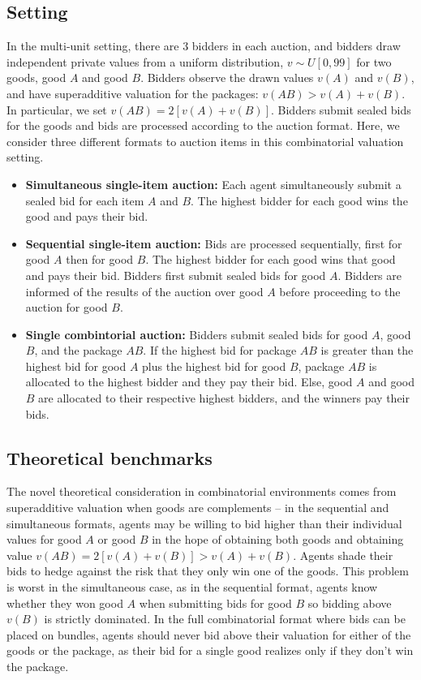 \documentclass{article} %
\begin{document}
\subsection{Setting} In the multi-unit setting, there are 3 bidders in each auction, and bidders draw independent private values from a uniform distribution, $v \sim U[0, 99]$ for two goods, good $A$ and good $B$. 
Bidders observe the drawn values $v(A)$ and $v(B)$, and have superadditive valuation for the packages: $v(AB) > v(A) + v(B)$. 
In particular, we set $v(AB) = 2[v(A) + v(B)]$.
Bidders submit sealed bids for the goods and bids are processed according to the auction format. 
Here, we consider three different formats to auction items in this combinatorial valuation setting.
\begin{itemize}
    \item \textbf{Simultaneous single-item auction:} Each agent simultaneously submit a sealed bid for each item $A$ and $B$. The highest bidder for each good wins the good and pays their bid. \vspace{1mm}
    
    \item \textbf{Sequential single-item auction:} Bids are processed sequentially, first for good $A$ then for good $B$. The highest bidder for each good wins that good and pays their bid. Bidders first submit sealed bids for good $A$. Bidders are informed of the results of the auction over good $A$ before proceeding to the auction for good $B$. \vspace{1mm}
    
    \item \textbf{Single combintorial auction:} Bidders submit sealed bids for good $A$, good $B$, and the package $AB$. If the highest bid for package $AB$ is greater than the highest bid for good $A$ plus the highest bid for good $B$, package $AB$ is allocated to the highest bidder and they pay their bid. Else, good $A$ and good $B$ are allocated to their respective highest bidders, and the winners pay their bids. 
\end{itemize}

\subsection{Theoretical benchmarks}
The novel theoretical consideration in combinatorial environments comes from superadditive valuation when goods are complements -- in the sequential and simultaneous formats, agents may be willing to bid higher than their individual values for good $A$ or good $B$ in the hope of obtaining both goods and obtaining value $v(AB) = 2[v(A) + v(B)] > v(A)+v(B)$. 
Agents shade their bids to hedge against the risk that they only win one of the goods. 
This problem is worst in the simultaneous case, as in the sequential format, agents know whether they won good $A$ when submitting bids for good $B$ so bidding above $v(B)$ is strictly dominated. 
In the full combinatorial format where bids can be placed on bundles, agents should never bid above their valuation for either of the goods or the package, as their bid for a single good realizes only if they don't win the package.
\end{document}
